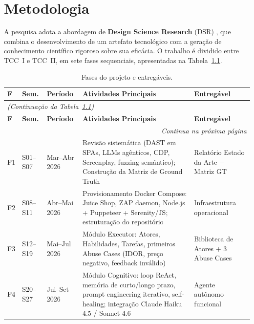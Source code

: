 \documentclass[
    12pt,
    openany,
    oneside,
    a4paper,
    brazil
]{abntex2}
\begin{document}
\chapter{Metodologia}

A pesquisa adota a abordagem de \textbf{Design Science Research} (DSR)
\cite{hevner2004design}, que combina o desenvolvimento de um artefato
tecnológico com a geração de conhecimento científico rigoroso sobre sua
eficácia. O trabalho é dividido entre TCC~I e TCC~II, em sete fases
sequenciais, apresentadas na Tabela~\ref{tab:fases}.

\begin{longtable}{p{0.6cm}p{1.6cm}p{2.0cm}p{5.2cm}p{3.0cm}}
\caption{Fases do projeto e entregáveis.\label{tab:fases}}\\
\toprule
\textbf{F} & \textbf{Sem.} & \textbf{Período} &
\textbf{Atividades Principais} & \textbf{Entregável} \\
\midrule
\endfirsthead
\multicolumn{5}{l}{\textit{(Continuação da Tabela~\ref{tab:fases})}}\\
\toprule
\textbf{F} & \textbf{Sem.} & \textbf{Período} &
\textbf{Atividades Principais} & \textbf{Entregável} \\
\midrule
\endhead
\midrule
\multicolumn{5}{r}{\textit{Continua na próxima página}}\\
\endfoot
\bottomrule
\endlastfoot

F1 & S01–S07 & Mar–Abr 2026 &
Revisão sistemática (DAST em SPAs, LLMs agênticos, CDP, Screenplay,
fuzzing semântico); Construção da Matriz de Ground Truth &
Relatório Estado da Arte + Matriz GT \\[4pt]

F2 & S08–S11 & Abr–Mai 2026 &
Provisionamento Docker Compose: Juice Shop, ZAP daemon, Node.js
+ Puppeteer + Serenity/JS; estruturação do repositório &
Infraestrutura operacional \\[4pt]

F3 & S12–S19 & Mai–Jul 2026 &
Módulo Executor: Atores, Habilidades, Tarefas, primeiros Abuse Cases
(IDOR, preço negativo, feedback inválido) &
Biblioteca de Atores + 3 Abuse Cases \\[4pt]

F4 & S20–S27 & Jul–Set 2026 &
Módulo Cognitivo: loop ReAct, memória de curto/longo prazo, prompt
engineering iterativo, self-healing; integração Claude Haiku 4.5 /
Sonnet 4.6 &
Agente autônomo funcional \\[4pt]


\end{longtable}
\end{document}
